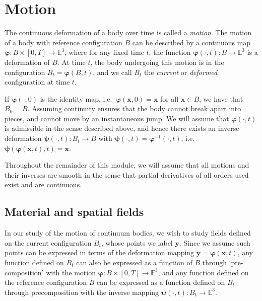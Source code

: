 \documentclass[
  letterpaper,
  DIV=11,
  numbers=noendperiod]{scrreprt}
\theoremstyle{plain}
\theoremstyle{remark}
\begin{document}
\section{Motion}\label{motion}

The continuous deformation of a body over time is called a
\emph{motion}. The motion of a body with reference configuration \(B\)
can be described by a continuous map
\({\boldsymbol{\varphi}}:B\times[0,T]\to{\mathbb{E}}^3\), where for any
fixed time \(t\), the function
\({\boldsymbol{\varphi}}(\cdot,t):B\to{\mathbb{E}}^3\) is a deformation
of \(B\). At time \(t\), the body undergoing this motion is in the
configuration \(B_t = {\boldsymbol{\varphi}}(B,t)\), and we call \(B_t\)
the \emph{current} or \emph{deformed} configuration at time \(t\).

If \({\boldsymbol{\varphi}}(\cdot,0)\) is the identity map,
i.e.~\({\boldsymbol{\varphi}}({\boldsymbol{x}},0) = {\boldsymbol{x}}\)
for all \({\boldsymbol{x}}\in B\), we have that \(B_0=B\). Assuming
continuity ensures that the body cannot break apart into pieces, and
cannot move by an instantaneous jump. We will assume that
\({\boldsymbol{\varphi}}(\cdot,t)\) is admissible in the sense described
above, and hence there exists an inverse deformation
\({\boldsymbol{\psi}}(\cdot,t):B_t\to B\) with
\({\boldsymbol{\psi}}(\cdot,t)={\boldsymbol{\varphi}}^{-1}(\cdot,t)\),
i.e.
\({\boldsymbol{\psi}}({\boldsymbol{\varphi}}({\boldsymbol{x}},t),t) = {\boldsymbol{x}}\).

Throughout the remainder of this module, we will assume that all motions
and their inverses are smooth in the sense that partial derivatives of
all orders used exist and are continuous.

\subsection{Material and spatial
fields}\label{material-and-spatial-fields}

In our study of the motion of continuum bodies, we wish to study fields
defined on the current configuration \(B_t\), whose points we label
\({\boldsymbol{y}}\). Since we assume such points can be expressed in
terms of the deformation mapping
\({\boldsymbol{y}}={\boldsymbol{\varphi}}({\boldsymbol{x}},t)\), any
function defined on \(B_t\) can also be expressed as a function of \(B\)
through `pre-composition' with the motion
\({\boldsymbol{\varphi}}:B\times[0,T]\to{\mathbb{E}}^3\), and any
function defined on the reference configuration \(B\) can be expressed
as a function defined on \(B_t\) through precomposition with the inverse
mapping \({\boldsymbol{\psi}}(\cdot,t) : B_t\to{\mathbb{E}}^3\).
\end{document}
